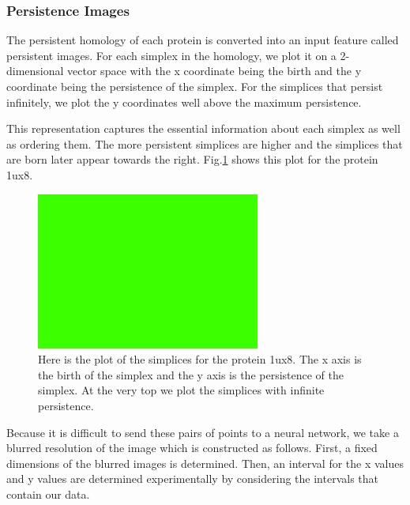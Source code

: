 \documentclass[12pt, a4paper, twocolumn, fullpage]{article}
\theoremstyle{plain}
\theoremstyle{definition}
\theoremstyle{remark}
\begin{document}
\subsubsection{ Persistence Images}

The persistent homology of each protein is converted into an input feature called persistent images. For each simplex in the homology, we plot it on a 2-dimensional vector space with the x coordinate being the birth and the y coordinate being the persistence of the simplex. For the simplices that persist infinitely, we plot the y coordinates well above the maximum persistence.

This representation captures the essential information about each simplex as well as ordering them. The more persistent simplices are higher and the simplices that are born later appear towards the right.  Fig.\ref{persistencePlot} shows this plot for the protein 1ux8.

\begin{figure}
    \includegraphics[width=\linewidth]{img/blank.png}
    \caption{Here is the plot of the simplices for the protein 1ux8. The x axis is the birth of the simplex and the y axis is the persistence of the simplex. At the very top we plot the simplices with infinite persistence.}
    \label{persistencePlot}
\end{figure}

Because it is difficult to send these pairs of points to a neural network, we take a blurred resolution of the image which is constructed as follows. First, a fixed dimensions of the blurred images is determined. Then, an interval for the x values and y values are determined experimentally by considering the intervals that contain our data. 
\end{document}
